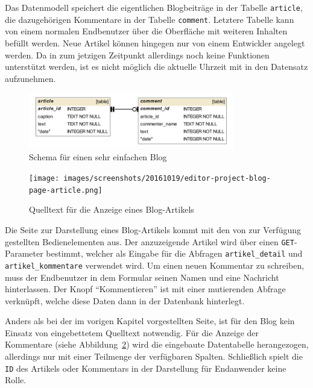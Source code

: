 Das Datenmodell speichert die eigentlichen Blogbeiträge in der Tabelle \texttt{article}, die dazugehörigen Kommentare in der Tabelle \texttt{comment}. Letztere Tabelle kann von einem normalen Endbenutzer über die Oberfläche mit weiteren Inhalten befüllt werden. Neue Artikel können hingegen nur von einem Entwickler angelegt werden. Da in \idename{} zum jetzigen Zeitpunkt allerdings noch keine Funktionen unterstützt werden, ist es nicht möglich die aktuelle Uhrzeit mit in den Datensatz aufzunehmen.

\begin{figure}[h]
  \centering \includegraphics[width=0.8\textwidth]{images/db-schema/blog}
  \caption{Schema für einen sehr einfachen Blog}
  \label{fig:project-blog-schema}
\end{figure}

\begin{figure}[h]
  \centering \texttt{[image: images/screenshots/20161019/editor-project-blog-page-article.png]}
  \caption{Quelltext für die Anzeige eines Blog-Artikels}
  \label{fig:project-blog-page-article}
\end{figure}

Die Seite zur Darstellung eines Blog-Artikels kommt mit den von \idename{} zur Verfügung gestellten Bedienelementen aus. Der anzuzeigende Artikel wird über einen \texttt{GET}-Parameter bestimmt, welcher als Eingabe für die Abfragen \texttt{artikel\_detail} und \texttt{artikel\_kommentare} verwendet wird. Um einen neuen Kommentar zu schreiben, muss der Endbenutzer in dem Formular seinen Namen und eine Nachricht hinterlassen. Der Knopf "`Kommentieren"' ist mit einer mutierenden Abfrage verknüpft, welche diese Daten dann in der Datenbank hinterlegt.

Anders als bei der im vorigen Kapitel  vorgestellten Seite, ist für den Blog kein Einsatz von eingebettetem Quelltext notwendig. Für die Anzeige der Kommentare (siehe Abbildung~\ref{fig:project-blog-page-article}) wird die eingebaute Datentabelle herangezogen, allerdings nur mit einer Teilmenge der verfügbaren Spalten. Schließlich spielt die \texttt{ID} des Artikels oder Kommentars in der Darstellung für Endanwender keine Rolle.

